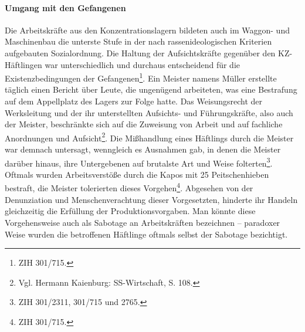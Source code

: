 \documentclass[a4paper,12pt,ngerman,
]{nisebook}
\begin{document}
\paragraph{Umgang mit den Gefangenen}
Die Arbeitskräfte aus den Konzentrationslagern bildeten auch im Waggon- und Maschinenbau die unterste Stufe in der nach rassenideologischen Kriterien aufgebauten Sozialordnung.
Die Haltung der Aufsichtskräfte gegenüber den KZ-Häftlingen war unterschiedlich und durchaus entscheidend für die Existenzbedingungen der Gefangenen\footnote{ZIH 301/715.}. Ein Meister namens Müller erstellte täglich einen Bericht über Leute, die ungenügend arbeiteten, was eine Bestrafung auf dem Appellplatz des Lagers zur Folge hatte. Das Weisungsrecht der Werksleitung und der ihr unterstellten Aufsichts- und Führungskräfte, also auch der Meister, beschränkte sich auf die Zuweisung von Arbeit und auf fachliche Anordnungen und Aufsicht\footnote{Vgl. Hermann Kaienburg: SS-Wirtschaft, S. 108.}. Die Mißhandlung eines Häftlings durch die Meister war demnach untersagt, wenngleich es Ausnahmen gab, in denen die Meister darüber hinaus, ihre Untergebenen auf brutalste Art und Weise folterten\footnote{ZIH 301/2311, 301/715 und 2765.}. Oftmals wurden Arbeitsverstöße durch die Kapos mit 25 Peitschenhieben bestraft, die Meister tolerierten dieses Vorgehen\footnote{ZIH 301/715.}. Abgesehen von der Denunziation und Menschenverachtung dieser Vorgesetzten, hinderte ihr Handeln gleichzeitig die Erfüllung der Produktionsvorgaben. Man könnte diese Vorgehensweise auch als Sabotage an Arbeitskräften bezeichnen -- paradoxer Weise wurden die betroffenen Häftlinge oftmals selbst der Sabotage bezichtigt.
\end{document}
